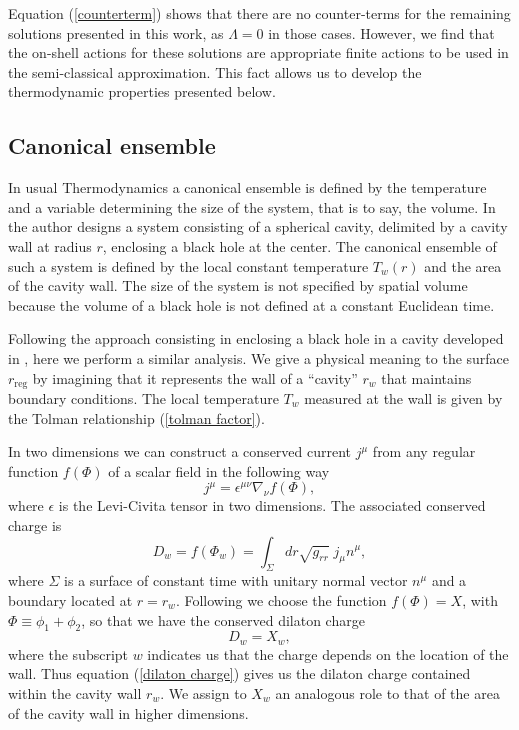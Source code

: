 \documentclass[sn-mathphys,Numbered]{sn-jnl}%
\theoremstyle{thmstyleone}%
\theoremstyle{thmstyletwo}%
\theoremstyle{thmstylethree}%
\begin{document}
Equation (\ref{counterterm}) shows that there are no counter-terms for the remaining solutions presented in this work, as $\Lambda=0$ in those cases. However, we find that the on-shell actions for these solutions are appropriate finite actions to be used in the semi-classical approximation. This fact allows us to develop the thermodynamic properties presented below.

\subsection{Canonical ensemble} \label{sec 4.2.1}
In usual Thermodynamics a canonical ensemble is defined by the temperature and a variable determining the size of the system, that is to say, the volume. In \cite{York2} the author designs a system consisting of a spherical cavity, delimited by a cavity wall at radius $r$, enclosing  a black hole at the center. The canonical ensemble of such a system is defined by the local constant temperature $T_w(r)$ and the area of the cavity wall. The size of the system is not specified by spatial volume because the volume of a black hole is not defined at a constant Euclidean time. 

Following the approach consisting in enclosing a black hole in a cavity developed in \cite{Perry, Davis, Grumiller}, here we perform a similar analysis. We give a physical meaning to the surface  $r_{\text{reg}}$ by imagining that it represents the wall of a ``cavity'' $r_w$ that maintains boundary conditions. The local temperature $T_w$ measured at the wall is  given by the Tolman relationship (\ref{tolman factor}). 

In two dimensions we can construct a conserved current $j^{\mu}$ from any regular function $f(\Phi)$ of a scalar field in the following way
%
\begin{equation}
    j^{\mu}=\epsilon^{\mu \nu} \nabla _{\nu}f(\Phi),
\end{equation}
where $\epsilon$ is the Levi-Civita tensor in two dimensions. The associated conserved charge is
\begin{equation}
    D_w=f(\Phi_w)=\int_{\Sigma} dr \sqrt{g_{rr}} \;j_{\mu} n^{\mu},
\end{equation}
where $\Sigma$ is a surface of constant time with unitary normal vector $n^{\mu}$ and a boundary located at $r=r_w$.  Following \cite{Perry} we choose the function $f(\Phi)= X$, with $\Phi \equiv \phi_1+\phi_2$, so that we have the conserved dilaton charge
\begin{equation}\label{dilaton charge}
    D_w=X_w,
\end{equation}
%
where the subscript $w$ indicates us that the charge depends on the location of the wall. Thus equation (\ref{dilaton charge}) gives us the dilaton charge contained within the cavity wall $r_w$. We assign to $X_w$ an analogous role to that of the area of the cavity wall in higher dimensions.
\end{document}
